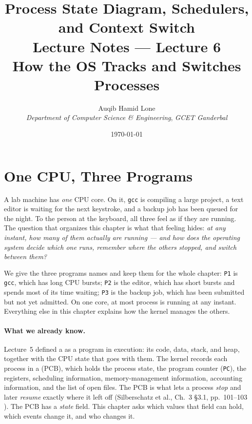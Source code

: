 \documentclass[11pt]{article}
\title{Process State Diagram, Schedulers, and Context Switch\\\large Lecture Notes --- Lecture 6\\
  \normalsize How the OS Tracks and Switches Processes}
\author{Auqib Hamid Lone\\[0.3em]
  \emph{Department of Computer Science \& Engineering}, \emph{GCET Ganderbal}}
\date{\today}
\begin{document}
\maketitle

\section{One CPU, Three Programs}

A lab machine has \emph{one} CPU core. On it, \texttt{gcc} is compiling a large
project, a text editor is waiting for the next keystroke, and a backup job has
been queued for the night. To the person at the keyboard, all three feel as if
they are running. The question that organizes this chapter is what that
feeling hides: \emph{at any instant, how many of them actually are running ---
and how does the operating system decide which one runs, remember where the
others stopped, and switch between them?}

We give the three programs names and keep them for the whole chapter:
\texttt{P1} is \texttt{gcc}, which has long CPU bursts; \texttt{P2} is the
editor, which has short bursts and spends most of its time waiting;
\texttt{P3} is the backup job, which has been submitted but not yet admitted.
On one core, at most  process is running at any instant. Everything
else in this chapter explains how the kernel manages the others.

\paragraph{What we already know.} Lecture~5 defined a  as a
program in execution: its code, data, stack, and heap, together with the CPU
state that goes with them. The kernel records each process in a  (PCB), which holds the process state, the program counter
(\texttt{PC}), the registers, scheduling information, memory-management
information, accounting information, and the list of open files. The PCB is
what lets a process \emph{stop} and later \emph{resume} exactly where it left
off (Silberschatz et al., Ch.~3 \S3.1, pp.~101--103
\cite{SilberschatzOSC_operating_system_concepts}). The PCB has a \emph{state}
field. This chapter asks which values that field can hold, which events change
it, and who changes it.
\end{document}
